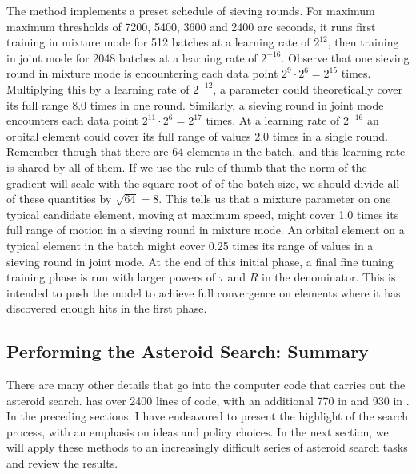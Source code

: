 The method  implements a preset schedule of sieving rounds.
For maximum maximum thresholds of 7200, 5400, 3600 and 2400 arc seconds, 
it runs first training in mixture mode for 512 batches at a learning rate of $2^{12}$, 
then training in joint mode for 2048 batches at a learning rate of $2^{-16}$.
Observe that one sieving round in mixture mode is encountering each data point $2^{9} \cdot 2^{6} = 2^{15}$ times.
Multiplying this by a learning rate of $2^{-12}$, a parameter could theoretically cover its full range 8.0 times in one round.
Similarly, a sieving round in joint mode encounters each data point $2^{11} \cdot 2^{6} = 2^{17}$ times.
At a learning rate of $2^{-16}$ an orbital element could cover its full range of values 2.0 times in a single round.
Remember though that there are 64 elements in the batch, and this learning rate is shared by all of them.
If we use the rule of thumb that the norm of the gradient will scale with the square root of of the batch size,
we should divide all of these quantities by $\sqrt{64} = 8$.
This tells us that a mixture parameter on one typical candidate element, moving at maximum speed,
might cover 1.0 times its full range of motion in a sieving round in mixture mode.
An orbital element on a typical element in the batch might cover 0.25 times its range of values
in a sieving round in joint mode.
At the end of this initial phase, a final fine tuning training phase is run with larger powers of $\tau$ and $R$ in the denominator.
This is intended to push the model to achieve full convergence on elements where it has discovered enough hits in the first phase.

\subsection{Performing the Asteroid Search: Summary}
There are many other details that go into the computer code that carries out the asteroid search.
 has over 2400 lines of code, with an additional 770 in  and 930 in .
In the preceding sections, I have endeavored to present the highlight of the search process, with an emphasis on ideas and policy choices.
In the next section, we will apply these methods to an increasingly difficult series of asteroid search tasks and review the results.